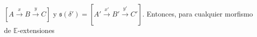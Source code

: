 \documentclass[preview]{standalone}
\begin{document}
\begin{center}
$[A\xrightarrow{x} B\xrightarrow{y} C]$ y $\mathfrak{s}(\delta') = [A'\xrightarrow{x'} B'\xrightarrow{y'} C']$. Entonces, para cualquier morfismo de $\mathbb{E}$-extensiones
\end{center}
\end{document}

